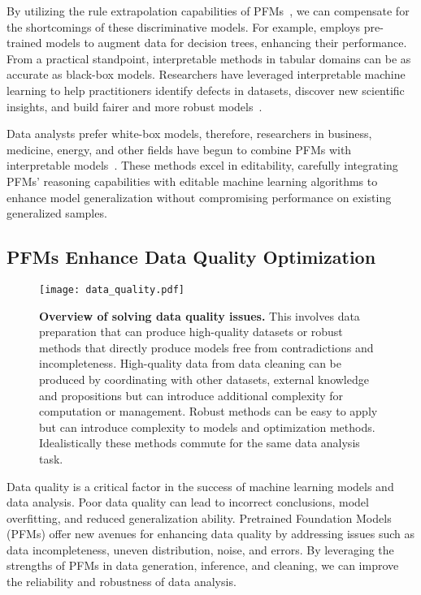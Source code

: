   By utilizing the rule extrapolation capabilities of PFMs~\cite{reizingerposition}, we can compensate for the shortcomings of these discriminative models. For example, \cite{nam2024optimized} employs pre-trained models to augment data for decision trees, enhancing their performance. From a practical standpoint, interpretable methods in tabular domains can be as accurate as black-box models. Researchers have leveraged interpretable machine learning to help practitioners identify defects in datasets, discover new scientific insights, and build fairer and more robust models~\cite{caruana2022data}.
  
  Data analysts prefer white-box models, therefore, researchers in business, medicine, energy, and other fields have begun to combine PFMs with interpretable models~\cite{vertsel2024hybrid,gerussi2022llm,Zhang2024LargeLM}. These methods excel in editability, carefully integrating PFMs' reasoning capabilities with editable machine learning algorithms to enhance model generalization without compromising performance on existing generalized samples.
  
  
  \subsection{PFMs Enhance Data Quality Optimization}\label{sec:data_quality}
  
  \begin{figure*}[h]
    \centering
    \texttt{[image: data\_quality.pdf]} %
    \caption{\textbf{Overview of solving data quality issues.} This involves data preparation that can produce high-quality datasets or robust methods that directly produce models free from contradictions and incompleteness. High-quality data from data cleaning can be produced by coordinating with other datasets, external knowledge and propositions but can introduce additional complexity for computation or management. Robust methods can be easy to apply but can introduce complexity to models and optimization methods. Idealistically these methods commute for the same data analysis task.}
    \label{fig:data_quality}
  \end{figure*}
  
  
  Data quality is a critical factor in the success of machine learning models and data analysis. Poor data quality can lead to incorrect conclusions, model overfitting, and reduced generalization ability. Pretrained Foundation Models (PFMs) offer new avenues for enhancing data quality by addressing issues such as data incompleteness, uneven distribution, noise, and errors. By leveraging the strengths of PFMs in data generation, inference, and cleaning, we can improve the reliability and robustness of data analysis.
  
